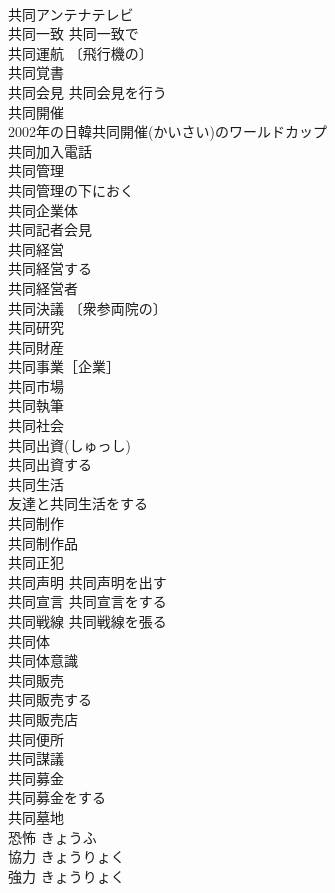 \documentclass[8pt]{extreport}
\begin{document}
\begin{CJK}{UTF8}{min}
\\	共同アンテナテレビ 
\\	共同一致 共同一致で 
\\	共同運航 〔飛行機の〕
\\	共同覚書 
\\	共同会見 共同会見を行う 
\\	共同開催 
\\	2002年の日韓共同開催(かいさい)のワールドカップ 
\\	共同加入電話 
\\	共同管理 
\\	共同管理の下におく 
\\	共同企業体 
\\	共同記者会見 
\\	共同経営 
\\	共同経営する 
\\	共同経営者 
\\	共同決議 〔衆参両院の〕
\\	共同研究 
\\	共同財産 
\\	共同事業［企業］ 
\\	共同市場 
\\	共同執筆 
\\	共同社会 
\\	共同出資(しゅっし) 
\\	共同出資する 
\\	共同生活 
\\	友達と共同生活をする 
\\	共同制作 
\\	共同制作品 
\\	共同正犯 
\\	共同声明 共同声明を出す 
\\	共同宣言 共同宣言をする 
\\	共同戦線 共同戦線を張る 
\\	共同体 
\\	共同体意識 
\\	共同販売 
\\	共同販売する 
\\	共同販売店 
\\	共同便所 
\\	共同謀議 
\\	共同募金 
\\	共同募金をする 
\\	共同墓地 
\\	恐怖	きょうふ	
\\	協力	きょうりょく	
\\	強力	きょうりょく	

\end{CJK}
\end{document}
